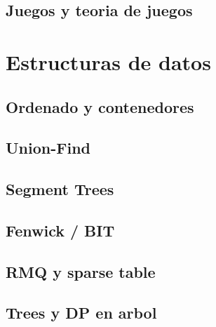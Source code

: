 \documentclass[twocolumn]{article}
\begin{document}
	\subsection{Juegos y teoria de juegos}
	
	

	\section{Estructuras de datos}
	\subsection{Ordenado y contenedores}
	
	
	

	\subsection{Union-Find}
	
	

	\subsection{Segment Trees}
	
	
	
	
	
	
	
	

	\subsection{Fenwick / BIT}
	
	
	

	\subsection{RMQ y sparse table}
	
	

	\subsection{Trees y DP en arbol}
	
	
	
	
\end{document}
